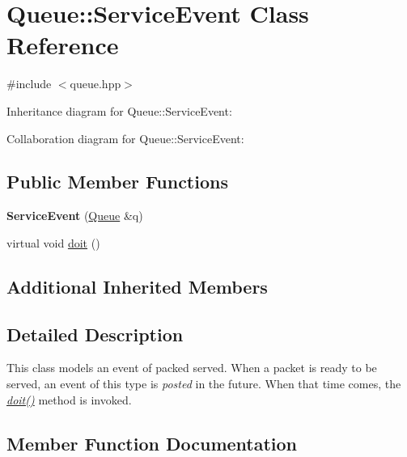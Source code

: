 \hypertarget{classQueue_1_1ServiceEvent}{}\section{Queue\+:\+:Service\+Event Class Reference}
\label{classQueue_1_1ServiceEvent}


{\ttfamily \#include $<$queue.\+hpp$>$}



Inheritance diagram for Queue\+:\+:Service\+Event\+:


Collaboration diagram for Queue\+:\+:Service\+Event\+:
\subsection*{Public Member Functions}
\begin{DoxyCompactItemize}
\item 
{\bfseries Service\+Event} (\hyperlink{classQueue}{Queue} \&q)\hypertarget{classQueue_1_1ServiceEvent_aee7a3f1c56008dc3ff3bcc2e5e3b3fcc}{}\label{classQueue_1_1ServiceEvent_aee7a3f1c56008dc3ff3bcc2e5e3b3fcc}

\item 
virtual void \hyperlink{classQueue_1_1ServiceEvent_a5f9784f40ba49e3cbe9c2138ba3f3f35}{doit} ()
\end{DoxyCompactItemize}
\subsection*{Additional Inherited Members}


\subsection{Detailed Description}
This class models an event of packed served. When a packet is ready to be served, an event of this type is {\itshape posted} in the future. When that time comes, the {\itshape \hyperlink{classQueue_1_1ServiceEvent_a5f9784f40ba49e3cbe9c2138ba3f3f35}{doit()}} method is invoked. 

\subsection{Member Function Documentation}
